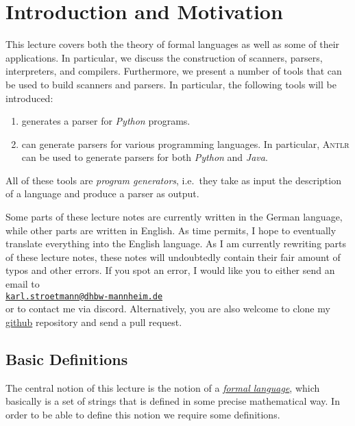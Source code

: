 \chapter{Introduction and Motivation}
This lecture covers both the theory of formal languages as well as some of their applications.
In particular, we discuss the construction of scanners, parsers, interpreters, and compilers.  Furthermore, we 
present a number of tools that can be used to build scanners and parsers.  In particular, 
the following tools will be introduced:
\begin{enumerate}
\item {}  generates a parser for \textsl{Python} programs. 
\item {}  can generate parsers for various programming languages.  In
      particular, \textsc{Antlr} can be used to generate parsers for both \textsl{Python} and \textsl{Java}.  
\end{enumerate}
All of these tools are \emph{program generators}, i.e.~they take as input the description of a
language and produce a parser as output. 

Some parts of these lecture notes are currently written in the German language, while other parts 
are written in English.  As time permits, I hope to eventually translate everything into the English language.
As I am currently rewriting parts of these lecture notes, these notes will undoubtedly contain their
fair amount of typos and other errors.  If you spot an error, I would like you to either
send an email to 
\\[0.2cm]
\hspace*{1.3cm}
\href{mailto:karl.stroetmann@dhbw-mannheim.de}{\texttt{karl.stroetmann@dhbw-mannheim.de}}
\\[0.2cm]
or to contact me via discord.  Alternatively, you are also welcome to clone my
\href{https://github.com/karlstroetmann/Formal-Languages/}{github} repository and send a pull request.

\section{Basic Definitions}
The central notion of this lecture is the notion of a 
\href{http://en.wikipedia.org/wiki/Formal_language}{\emph{formal language}},  which
basically is a set of strings that is defined in some precise mathematical way.  In order to be able to define
this notion we require some definitions.  

